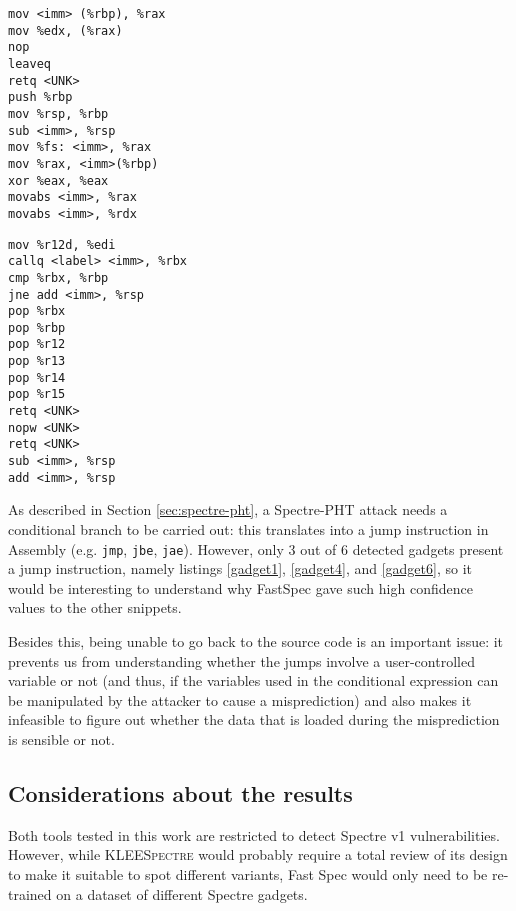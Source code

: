 \documentclass[target=mst,aauheader=aics]{thud}
\theoremstyle{definition}
\begin{document}
	\begin{minipage}{.45\textwidth}
	\begin{lstlisting}[caption={Window 11598-11601}, label=gadget5]
mov <imm> (%rbp), %rax
mov %edx, (%rax)
nop
leaveq
retq <UNK>
push %rbp
mov %rsp, %rbp
sub <imm>, %rsp
mov %fs: <imm>, %rax
mov %rax, <imm>(%rbp)
xor %eax, %eax
movabs <imm>, %rax
movabs <imm>, %rdx
	\end{lstlisting}
\end{minipage}\hfill
\begin{minipage}{.45\textwidth}
	\begin{lstlisting}[basicstyle=\footnotesize\ttfamily, caption={Window 11868-11902}, label=gadget6, numbers=right]
mov %r12d, %edi
callq <label> <imm>, %rbx
cmp %rbx, %rbp
jne add <imm>, %rsp
pop %rbx
pop %rbp
pop %r12
pop %r13
pop %r14
pop %r15
retq <UNK>
nopw <UNK>
retq <UNK>
sub <imm>, %rsp
add <imm>, %rsp
	\end{lstlisting}
\end{minipage}
	\vspace{3mm}
	
	As described in Section \ref{sec:spectre-pht}, a Spectre-PHT attack needs a conditional branch to be carried out: this translates into a jump instruction in Assembly (e.g. \texttt{jmp}, \texttt{jbe}, \texttt{jae}). However, only 3 out of 6 detected gadgets present a jump instruction, namely listings \ref{gadget1}, \ref{gadget4}, and \ref{gadget6}, so it would be interesting to understand why FastSpec gave such high confidence values to the other snippets. 
	
	Besides this, being unable to go back to the source code is an important issue: it prevents us from understanding whether the jumps involve a user-controlled variable or not (and thus, if the variables used in the conditional expression can be manipulated by the attacker to cause a misprediction) and also makes it infeasible to figure out whether the data that is loaded during the misprediction is sensible or not. 
	\subsection{Considerations about the results}\label{sec:final}
	Both tools tested in this work are restricted to detect Spectre v1 vulnerabilities. However, while \textsc{KLEESpectre} would probably require a total review of its design to make it suitable to spot different variants, Fast Spec would only need to be re-trained on a dataset of different Spectre gadgets. 
	
\end{document}
